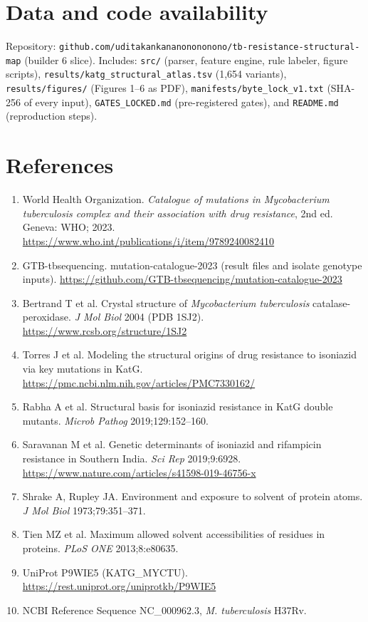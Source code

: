 \documentclass[11pt]{article}
\begin{document}
\section*{Data and code availability}
Repository: \texttt{github.com/uditakankananonononono/tb-resistance-structural-map} (builder 6 slice). Includes: \texttt{src/} (parser, feature engine, rule labeler, figure scripts), \texttt{results/katg\_structural\_atlas.tsv} (1,654 variants), \texttt{results/figures/} (Figures 1--6 as PDF), \texttt{manifests/byte\_lock\_v1.txt} (SHA-256 of every input), \texttt{GATES\_LOCKED.md} (pre-registered gates), and \texttt{README.md} (reproduction steps).

\section*{References}
\begin{enumerate}
\item World Health Organization. \textit{Catalogue of mutations in Mycobacterium tuberculosis complex and their association with drug resistance}, 2nd ed. Geneva: WHO; 2023. \url{https://www.who.int/publications/i/item/9789240082410}
\item GTB-tbsequencing. mutation-catalogue-2023 (result files and isolate genotype inputs). \url{https://github.com/GTB-tbsequencing/mutation-catalogue-2023}
\item Bertrand T et al. Crystal structure of \textit{Mycobacterium tuberculosis} catalase-peroxidase. \textit{J Mol Biol} 2004 (PDB 1SJ2). \url{https://www.rcsb.org/structure/1SJ2}
\item Torres J et al. Modeling the structural origins of drug resistance to isoniazid via key mutations in KatG. \url{https://pmc.ncbi.nlm.nih.gov/articles/PMC7330162/}
\item Rabha A et al. Structural basis for isoniazid resistance in KatG double mutants. \textit{Microb Pathog} 2019;129:152--160.
\item Saravanan M et al. Genetic determinants of isoniazid and rifampicin resistance in Southern India. \textit{Sci Rep} 2019;9:6928. \url{https://www.nature.com/articles/s41598-019-46756-x}
\item Shrake A, Rupley JA. Environment and exposure to solvent of protein atoms. \textit{J Mol Biol} 1973;79:351--371.
\item Tien MZ et al. Maximum allowed solvent accessibilities of residues in proteins. \textit{PLoS ONE} 2013;8:e80635.
\item UniProt P9WIE5 (KATG\_MYCTU). \url{https://rest.uniprot.org/uniprotkb/P9WIE5}
\item NCBI Reference Sequence NC\_000962.3, \textit{M. tuberculosis} H37Rv.
\end{enumerate}
\end{document}
